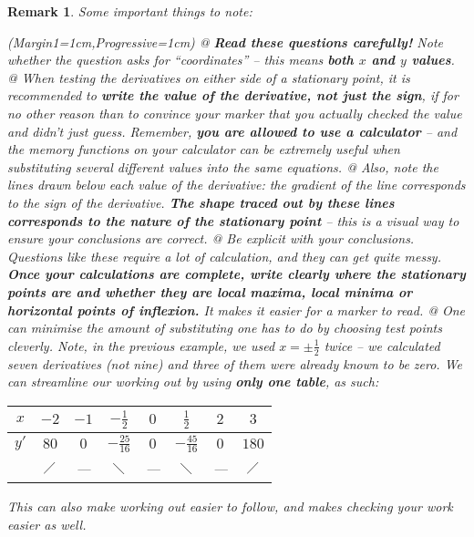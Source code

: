 \documentclass[a4paper,11pt]{article}
\newtheorem*{remark}{Remark}
\begin{document}
\begin{remark}\normalfont
	Some important things to note:
	\vspace{0.15cm}
	\begin{easylist}[itemize]
		\ListProperties(Margin1=1cm,Progressive=1cm)
			@ \textbf{Read these questions carefully!} Note whether the question asks for ``coordinates'' -- this means \textbf{both $x$ and $y$ values}.
			@ When testing the derivatives on either side of a stationary point, it is recommended to \textbf{write the value of the derivative, not just the sign}, if for no other reason than to convince your marker that you actually checked the value and didn't just guess. Remember, \textbf{you are allowed to use a calculator} -- and the memory functions on your calculator can be extremely useful when substituting several different values into the same equations.
			@ Also, note the lines drawn below each value of the derivative: the gradient of the line corresponds to the sign of the derivative. \textbf{The shape traced out by these lines corresponds to the nature of the stationary point} -- this is a visual way to ensure your conclusions are correct.
			@ Be explicit with your conclusions. Questions like these require a lot of calculation, and they can get quite messy. \textbf{Once your calculations are complete, write clearly where the stationary points are and whether they are local maxima, local minima or horizontal points of inflexion.} It makes it easier for a marker to read.
			@ One can minimise the amount of substituting one has to do by choosing test points cleverly. Note, in the previous example, we used $x=\pm\frac{1}{2}$ twice -- we calculated seven derivatives (not nine) and three of them were already known to be zero. We can streamline our working out by using \textbf{only one table}, as such:
			{\renewcommand{\arraystretch}{1.5}%
				\begin{table}[H]\centering
					\begin{tabular}{c|c|c|c|c|c|c|c}
						$x$  &   $-2$    & $-1$ &  $-\frac{1}{2}$  & $0$ &  $\frac{1}{2}$   & $2$ &    $3$    \\ \hline
						$y'$ &   $80$    & $0$  & $-\frac{25}{16}$ & $0$ & $-\frac{45}{16}$ & $0$ &   $180$   \\
						 ~   & $\diagup$ & ---  &   $\diagdown$    & --- &   $\diagdown$    & --- & $\diagup$
					\end{tabular}
			\end{table}}
			This can also make working out easier to follow, and makes checking your work easier as well.
	\end{easylist}
	\vspace{0.15cm}
\end{remark}
\end{document}
